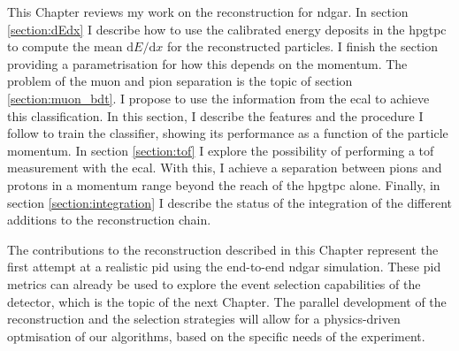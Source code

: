 This Chapter reviews my work on the reconstruction for \gls{ndgar}. In section \ref{section:dEdx} I describe how to use the calibrated energy deposits in the \gls{hpgtpc} to compute the mean $\mathrm{d}E/\mathrm{d}x$ for the reconstructed particles. I finish the section providing a parametrisation for how this depends on the momentum. The problem of the muon and pion separation is the topic of section \ref{section:muon_bdt}. I propose to use the information from the \gls{ecal} to achieve this classification. In this section, I describe the features and the procedure I follow to train the classifier, showing its performance as a function of the particle momentum. In section \ref{section:tof} I explore the possibility of performing a \gls{tof} measurement with the \gls{ecal}. With this, I achieve a separation between pions and protons in a momentum range beyond the reach of the \gls{hpgtpc} alone. Finally, in section \ref{section:integration} I describe the status of the integration of the different additions to the reconstruction chain.

The contributions to the reconstruction described in this Chapter represent the first attempt at a realistic \gls{pid} using the end-to-end \gls{ndgar} simulation. These \gls{pid} metrics can already be used to explore the event selection capabilities of the detector, which is the topic of the next Chapter. The parallel development of the reconstruction and the selection strategies will allow for a physics-driven optmisation of our algorithms, based on the specific needs of the experiment.